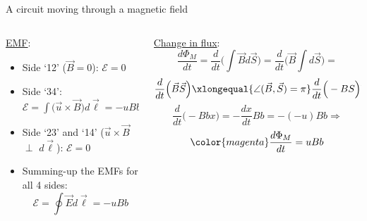 \begin{frame}{A circuit moving through a magnetic field}
\begin{columns}[t]
  \begin{column}{0.50\textwidth}
  {\scriptsize
    \underline{EMF}:\\
    \vspace{0.1cm}
    \begin{itemize}
       \item Side `12' ($\vec{B}=0$):
             $\mathcal{E} = 0$
       \item Side `34':
             $\mathcal{E} = \int \Big( \vec{u} \times \vec{B} \Big) d\vec{\ell} = -uBb$
       \item Side `23' and `14' ($\vec{u} \times \vec{B}$ $\perp$ $d\vec{\ell}$):
             $\mathcal{E} = 0$
       \item Summing-up the EMFs for all 4 sides:
            {\color{magenta}
              \begin{equation*}
               \mathcal{E} = \oint \vec{E} d\vec{\ell} = -uBb
              \end{equation*}
            }
    \end{itemize}
  }
  \end{column}
  \begin{column}{0.50\textwidth}
  {\scriptsize
    \underline{Change in flux}:\\
    \begin{equation*}
      \frac{d\Phi_{M}}{dt} =
        \frac{d}{dt} \Big( \int \vec{B} d\vec{S} \Big) =
        \frac{d}{dt} \Big( \vec{B} \int d\vec{S} \Big) =
    \end{equation*}
    \begin{equation*}
          \frac{d}{dt} \Big( \vec{B} \vec{S} \Big) \xlongequal{\angle(\vec{B}, \vec{S}) = \pi}
          \frac{d}{dt} \Big( -BS \Big) \xlongequal{S=bx}
    \end{equation*}
    \begin{equation*}
        \frac{d}{dt} \Big( -Bbx \Big) =
        - \frac{dx}{dt} B b = -(-u) B b \Rightarrow
    \end{equation*}
    \begin{equation*}
        {\color{magenta}
          \frac{d\Phi_{M}}{dt} = uBb
        }
    \end{equation*}
  }
  \end{column}
\end{columns}

\end{frame}

%
%
%

